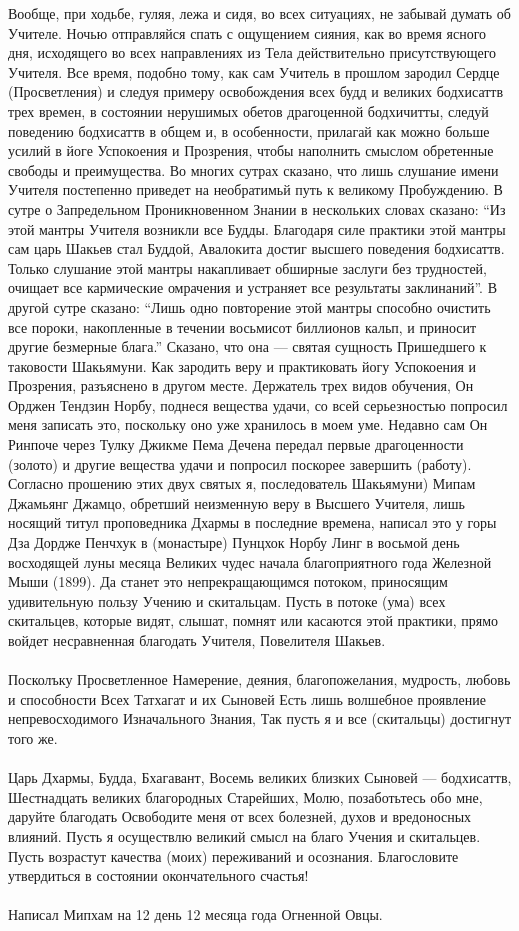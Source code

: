 Вообще, при ходьбе, гуляя, лежа и сидя, во всех ситуациях, не забывай думать об Учителе.
Ночью отправляйся спать с ощущением сияния, как во время ясного дня, исходящего
во всех направлениях из Тела действительно присутствующего Учителя. Все время,
подобно тому, как сам Учитель в прошлом зародил Сердце (Просветления) и следуя
примеру освобождения всех будд и великих бодхисаттв трех времен, в состоянии
нерушимых обетов драгоценной бодхичитты, следуй поведению бодхисаттв в общем и,
в особенности, прилагай как можно больше усилий в йоге Успокоения и Прозрения,
чтобы наполнить смыслом обретенные свободы и преимущества.
Во многих сутрах сказано, что лишь слушание имени Учителя постепенно приведет
на необратимьй путь к великому Пробуждению. В сутре о Запредельном Проникновенном
Знании в нескольких словах сказано:
“Из этой мантры Учителя возникли все Будды. Благодаря силе практики этой мантры
сам царь Шакьев стал Буддой, Авалокита достиг высшего поведения бодхисаттв.
Только слушание этой мантры накапливает обширные заслуги без трудностей,
очищает все кармические омрачения и устраняет все результаты заклинаний”.
В другой сутре сказано: “Лишь одно повторение этой мантры способно очистить
все пороки, накопленные в течении восьмисот биллионов кальп, и приносит другие
безмерные блага.” Сказано, что она — святая сущность Пришедшего к таковости Шакьямуни.
Как зародить веру и практиковать йогу Успокоения и Прозрения, разъяснено в другом месте.
Держатель трех видов обучения, Он Орджен Тендзин Норбу, поднеся вещества удачи,
со всей серьезностью попросил меня записать это, поскольку оно уже хранилось
в моем уме. Недавно сам Он Ринпоче через Тулку Джикме Пема Дечена передал
первые драгоценности (золото) и другие вещества удачи и попросил поскорее
завершить (работу). Согласно прошению этих двух святых я, последователь
Шакьямуни) Мипам Джамьянг Джамцо, обретший неизменную веру в Высшего
Учителя, лишь носящий титул проповедника Дхармы в последние времена,
написал это у горы Дза Дордже Пенчхук в (монастыре) Пунцхок Норбу Линг
в восьмой день восходящей луны месяца Великих чудес начала благоприятного
года Железной Мыши (1899). Да станет это непрекращающимся потоком, приносящим
удивительную пользу Учению и скитальцам. Пусть в потоке (ума) всех скитальцев,
которые видят, слышат, помнят или касаются этой практики, прямо войдет несравненная
благодать Учителя, Повелителя Шакьев.\\
\\
Посколъку Просветленное Намерение, деяния, благопожелания, мудрость, любовь и способности
Всех Татхагат и их Сыновей
Есть лишь волшебное проявление непревосходимого Изначального Знания,
Так пусть я и все (скитальцы) достигнут того же.\\
\\
Царь Дхармы, Будда, Бхагавант,
Восемь великих близких Сыновей — бодхисаттв,
Шестнадцать великих благородных Старейших,
Молю, позаботьтесь обо мне, даруйте благодать
Освободите меня от всех болезней, духов и вредоносных влияний.
Пусть я осуществлю великий смысл на благо Учения и скитальцев.
Пусть возрастут качества (моих) переживаний и осознания.
Благословите утвердиться в состоянии окончательного счастья!\\
\\
Написал Мипхам на 12 день 12 месяца года Огненной Овцы.
\footnotesize